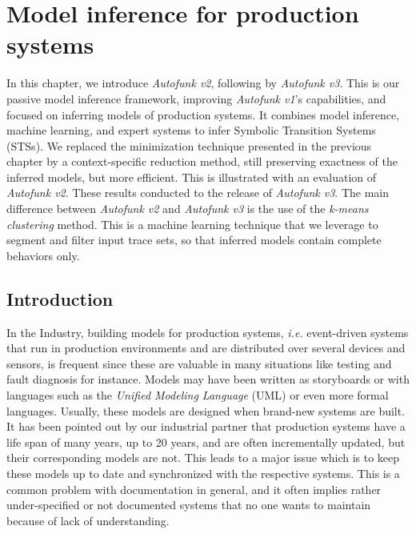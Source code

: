 \chapter{Model inference for production systems}
\label{sec:modelinf:prodsystems}

In this chapter, we introduce \emph{Autofunk v2}, following by
\emph{Autofunk v3}. This is our passive model inference
framework, improving \emph{Autofunk v1}'s capabilities, and
focused on inferring models of production systems. It combines
model inference, machine learning, and expert systems to infer
Symbolic Transition Systems (STSs). We replaced the minimization
technique presented in the previous chapter by a context-specific
reduction method, still preserving exactness of the inferred
models, but more efficient. This is illustrated with an
evaluation of \emph{Autofunk v2}. These results conducted to
the release of \emph{Autofunk v3}.  The main difference between
\emph{Autofunk v2} and \emph{Autofunk v3} is the use of the
\emph{k-means clustering} method. This is a machine learning
technique that we leverage to segment and filter input trace
sets, so that inferred models contain complete behaviors only.\\

\minitoc

\pagebreak

\section{Introduction}

In the Industry, building models for production systems,
\emph{i.e.} event-driven systems that run in production
environments and are distributed over several devices and
sensors, is frequent since these are valuable in many situations
like testing and fault diagnosis for instance. Models may have
been written as storyboards or with languages such as the \emph{Unified
Modeling Language} (UML) or even more formal languages. Usually,
these models are designed when brand-new systems are built. It
has been pointed out by our industrial partner that production
systems have a life span of many years, up to 20 years, and are
often incrementally updated, but their corresponding models are
not.  This leads to a major issue which is to keep these models
up to date and synchronized with the respective systems. This is
a common problem with documentation in general, and it often
implies rather under-specified or not documented systems that no
one wants to maintain because of lack of understanding.

